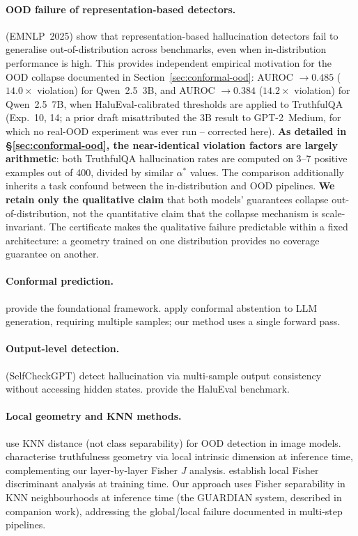 \documentclass[onecolumn]{jmlr}
\begin{document}
\paragraph{OOD failure of representation-based detectors.}
\citet{dubanowska2025ood} (EMNLP~2025) show that representation-based
hallucination detectors fail to generalise out-of-distribution across
benchmarks, even when in-distribution performance is high. This
provides independent empirical motivation for the OOD collapse
documented in Section~\ref{sec:conformal-ood}: AUROC $\to 0.485$
($14.0\times$ violation) for Qwen~2.5~3B, and AUROC $\to 0.384$
($14.2\times$ violation) for Qwen~2.5~7B, when HaluEval-calibrated
thresholds are applied to TruthfulQA (Exp.~10, 14; a prior draft
misattributed the 3B result to GPT-2~Medium, for which no real-OOD
experiment was ever run -- corrected here). \textbf{As detailed in
\S\ref{sec:conformal-ood}, the near-identical violation factors are
largely arithmetic}: both TruthfulQA hallucination rates are computed
on 3--7 positive examples out of 400, divided by similar $\alpha^*$
values. The comparison additionally inherits a task confound between
the in-distribution and OOD pipelines. \textbf{We retain only the
qualitative claim} that both models' guarantees collapse
out-of-distribution, not the quantitative claim that the collapse
mechanism is scale-invariant. The certificate makes the qualitative
failure predictable within a fixed architecture: a geometry trained on
one distribution provides no coverage guarantee on another.

\paragraph{Conformal prediction.}
\citet{angelopoulos2022} provide the foundational framework.
\citet{abbasi2024conformal} apply conformal abstention to LLM generation,
requiring multiple samples; our method uses a single forward pass.

\paragraph{Output-level detection.}
\citet{manakul2023selfcheckgpt} (SelfCheckGPT) detect hallucination via
multi-sample output consistency without accessing hidden states.
\citet{li2023halueval} provide the HaluEval benchmark.

\paragraph{Local geometry and KNN methods.}
\citet{sun2022ood} use KNN distance (not class separability) for OOD
detection in image models.  \citet{yin2024characterizing} characterise
truthfulness geometry via local intrinsic dimension at inference time,
complementing our layer-by-layer Fisher $J$ analysis.
\citet{sugiyama2007} establish local Fisher discriminant analysis at
training time.  Our approach uses Fisher
separability in KNN neighbourhoods at inference time (the GUARDIAN system,
described in companion work), addressing the global/local failure documented
in multi-step pipelines.
\end{document}
